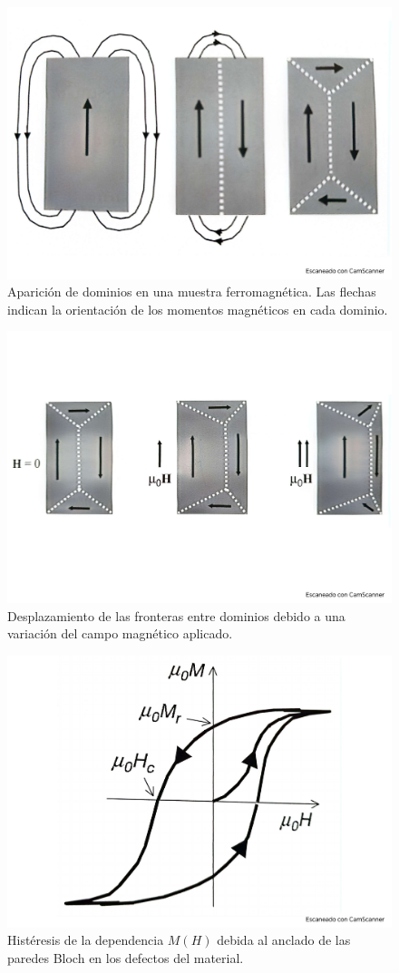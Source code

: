 \begin{figure}[h!] \centering
	\includegraphics[scale=0.35]{Cuerpo/Ch_10/Fotos libro 7.pdf}
	\caption{Aparición de dominios en una muestra ferromagnética. Las flechas indican la orientación de los momentos magnéticos en cada dominio.}
	\label{Fig:10-07}
\end{figure}
\begin{figure}[h!] \centering
	\includegraphics[scale=0.35]{Cuerpo/Ch_10/Fotos libro 8.pdf}
	\caption{Desplazamiento de las fronteras entre dominios debido a una variación del campo magnético aplicado.}
	\label{Fig:10-08}
\end{figure}
\begin{figure}[h!] \centering
	\includegraphics[scale=0.35]{Cuerpo/Ch_10/Fotos libro 9.pdf}
	\caption{Histéresis de la dependencia $M(H)$ debida al anclado de las paredes Bloch en los defectos del material.}
	\label{Fig:10-09}
\end{figure}